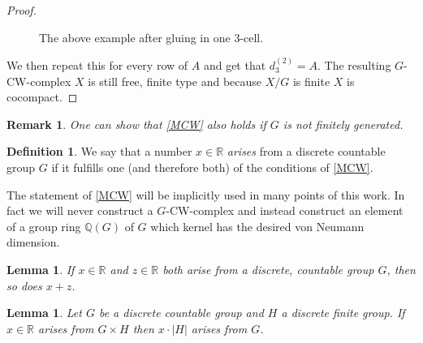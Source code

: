 \documentclass[12pt,a4paper]{scrartcl}
\theoremstyle{plain}
\newtheorem{Lemma}[Theorem]{Lemma}
\newtheorem{Remark}[Theorem]{Remark}
\theoremstyle{definition}
\newtheorem{Definition}[Theorem]{Definition}
\newcommand{\R}{\mathbb{R}} %
\newcommand{\Q}{\mathbb{Q}} %
\newcommand{\2}{\mathbb{Z} / 2 \mathbb{Z}}
\newcommand{\1}{\bar{1}}
\newcommand{\0}{\bar{0}}
\begin{document}
\begin{proof}
\begin{figure}[H]
			\caption{The above example after gluing in one $3$-cell.}
			\label{GCW_Grafik2}
		\end{figure}
		
		
	We then repeat this for every row of $A$ and get that $d_3^{(2)} = A$. The resulting $G$-CW-complex $X$ is still free, finite type and because $X/G$ is finite $X$ is cocompact.
\end{proof}




\begin{Remark}
	One can show that \ref{MCW} also holds if $G$ is not finitely generated.
\end{Remark}
\begin{Definition}\label{def_arising}
	We say that a number $x \in \R$ \emph{arises} from a discrete countable group $G$ if it fulfills one (and therefore both) of the conditions of \ref{MCW}.
\end{Definition}
The statement of \ref{MCW} will be implicitly used in many points of this work. In fact we will never construct a $G$-CW-complex and instead construct an element of a group ring $\Q (G)$ of $G$ which kernel has the desired von Neumann dimension.


\begin{Lemma}\label{add}
	If $x \in \R$ and $z \in \R$ both arise from a discrete, countable group $G$, then so does $x + z$.
\end{Lemma}
\begin{Lemma}\label{mult}
	Let $G$ be a discrete countable group and $H$ a discrete finite group. If $x \in \R$ arises from $G \times H$ then $x \cdot |H|$ arises from $G$.
\end{Lemma}
\end{document}
